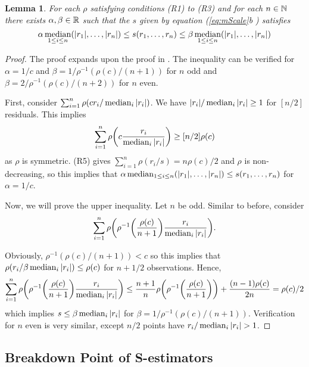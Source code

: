 \newtheorem{lemma}{Lemma}
\begin{lemma}
\label{lem:mScaleBound}
For each $\rho$ satisfying conditions (R1) to (R3) and for each $n \in \mathbb{N}$ there exists $\alpha,\beta \in \mathbb{R}$ such that the $s$ given by equation (\ref{eq:mScale}b ) satisfies
\begin{equation}
\label{eq:sIneq}
    \alpha \operatorname*{median}_{1\leq i \leq n}(|r_1|,\hdots, |r_n|) \leq s(r_1,\hdots, r_n) \leq \beta \operatorname*{median}_{1\leq i \leq n}(|r_1|,\hdots, |r_n|)
\end{equation}
\end{lemma}
\begin{proof}[Proof]
The proof expands upon the proof in \cite{rousseeuw1984least}. The inequality can be verified for $\alpha = 1/c$ and $\beta = 1/\rho^{-1}(\rho(c)/(n+1))$ for $n$ odd and $\beta = 2/\rho^{-1}(\rho(c)/(n+2))$ for $n$ even. 

First, consider $\sum_{i=1}^n \rho(c r_i/ \operatorname*{median}_i |r_i|) $. We have $|r_i|/ \operatorname*{median}_i |r_i| \geq 1$ for $[n/2]$ residuals. This implies 
$$\sum_{i=1}^n \rho\bigg(c\frac{r_i}{\operatorname*{median}_i |r_i|}\bigg) \geq [n/2] \rho(c)$$ 
as $\rho$ is symmetric. (R5) gives $\sum_{i=1}^n \rho(r_i/s) = n\rho(c)/2$ and $\rho$ is non-decreasing, so this implies that $\alpha \operatorname*{median}_{1\leq i \leq n}(|r_1|,\hdots, |r_n|) \leq s(r_1,\hdots, r_n)$ for $\alpha = 1/c$. 

Now, we will prove the upper inequality. Let $n$ be odd. Similar to before, consider 
$$\sum_{i=1}^n \rho\bigg(\rho^{-1}\bigg(\frac{\rho(c)}{n+1}\bigg) \frac{r_i}{\operatorname*{median}_i |r_i|}\bigg).$$

Obviously, $\rho^{-1}(\rho(c)/(n+1)) < c$ so this implies that $\rho(r_i/ \beta \operatorname*{median}_i |r_i|) \leq \rho(c)$ for $n+1/2$ observations. Hence, 
$$\sum_{i=1}^n \rho\bigg(\rho^{-1}\bigg(\frac{\rho(c)}{n+1}\bigg) \frac{r_i}{\operatorname*{median}_i |r_i|}\bigg) \leq \frac{n+1}{n} \rho\bigg(\rho^{-1}\bigg(\frac{\rho(c)}{n+1}\bigg)\bigg) + \frac{(n-1)\rho(c)}{2n} = \rho(c)/2$$ 
which implies $s \leq \beta \operatorname*{median}_i |r_i|$ for $\beta = 1/\rho^{-1}(\rho(c)/(n+1))$. Verification for $n$ even is very similar, except $n/2$ points have $r_i/ \operatorname*{median}_i |r_i| > 1$. 

\end{proof}

\subsection{Breakdown Point of S-estimators}

